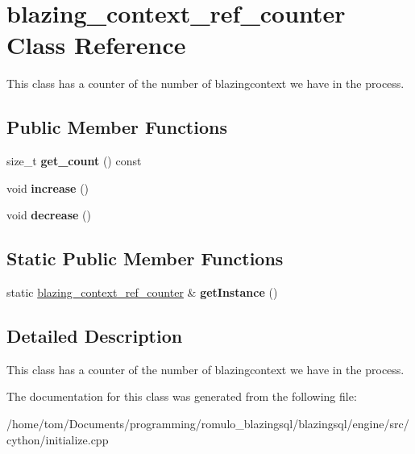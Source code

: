 \hypertarget{classblazing__context__ref__counter}{}\section{blazing\+\_\+context\+\_\+ref\+\_\+counter Class Reference}
\label{classblazing__context__ref__counter}


This class has a counter of the number of blazingcontext we have in the process.  


\subsection*{Public Member Functions}
\begin{DoxyCompactItemize}
\item 
\mbox{\label{classblazing__context__ref__counter_a50caef06e9796fd5c94f3b8934ac638e}} 
size\+\_\+t {\bfseries get\+\_\+count} () const
\item 
\mbox{\label{classblazing__context__ref__counter_ae05c7a18707965184f735d515da42f7e}} 
void {\bfseries increase} ()
\item 
\mbox{\label{classblazing__context__ref__counter_a54ea6fe6bb76cef1b1356d8a1b14b633}} 
void {\bfseries decrease} ()
\end{DoxyCompactItemize}
\subsection*{Static Public Member Functions}
\begin{DoxyCompactItemize}
\item 
\mbox{\label{classblazing__context__ref__counter_afaa8c9b818a314d2ad8b8631052c5d51}} 
static \hyperlink{classblazing__context__ref__counter}{blazing\+\_\+context\+\_\+ref\+\_\+counter} \& {\bfseries get\+Instance} ()
\end{DoxyCompactItemize}


\subsection{Detailed Description}
This class has a counter of the number of blazingcontext we have in the process. 

The documentation for this class was generated from the following file\+:\begin{DoxyCompactItemize}
\item 
/home/tom/\+Documents/programming/romulo\+\_\+blazingsql/blazingsql/engine/src/cython/initialize.\+cpp\end{DoxyCompactItemize}
